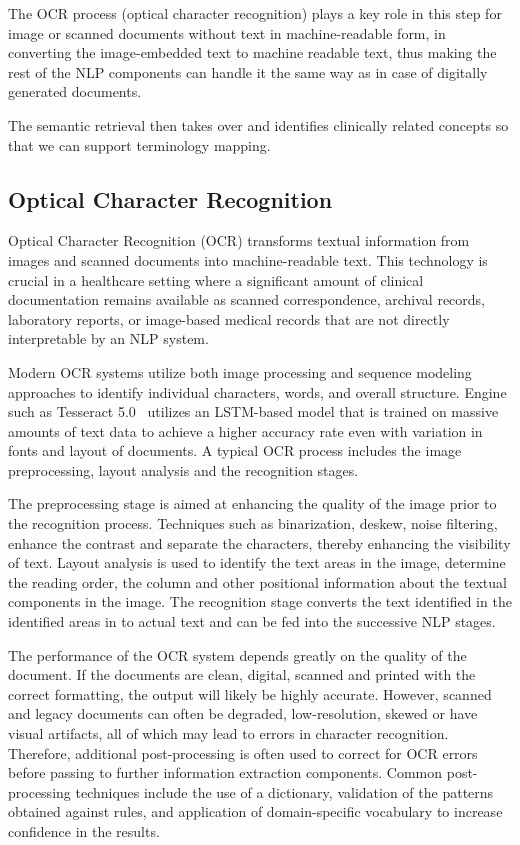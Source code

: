 The OCR process (optical character recognition) plays a key role in this step for image or scanned documents without text in machine-readable form, in converting the image-embedded text to machine readable text, thus making the rest of the NLP components can handle it the same way as in case of digitally generated documents.

The semantic retrieval then takes over and identifies clinically related concepts so that we can support terminology mapping.

\subsection{Optical Character Recognition}

Optical Character Recognition (OCR) transforms textual information from images and scanned documents into machine-readable text. This technology is crucial in a healthcare setting where a significant amount of clinical documentation remains available as scanned correspondence, archival records, laboratory reports, or image-based medical records that are not directly interpretable by an NLP system.

Modern OCR systems utilize both image processing and sequence modeling approaches to identify individual characters, words, and overall structure. Engine such as Tesseract 5.0~\cite{ref36} utilizes an LSTM-based model that is trained on massive amounts of text data to achieve a higher accuracy rate even with variation in fonts and layout of documents. A typical OCR process includes the image preprocessing, layout analysis and the recognition stages.

The preprocessing stage is aimed at enhancing the quality of the image prior to the recognition process. Techniques such as binarization, deskew, noise filtering, enhance the contrast and separate the characters, thereby enhancing the visibility of text. Layout analysis is used to identify the text areas in the image, determine the reading order, the column and other positional information about the textual components in the image. The recognition stage converts the text identified in the identified areas in to actual text and can be fed into the successive NLP stages.

The performance of the OCR system depends greatly on the quality of the document. If the documents are clean, digital, scanned and printed with the correct formatting, the output will likely be highly accurate. However, scanned and legacy documents can often be degraded, low-resolution, skewed or have visual artifacts, all of which may lead to errors in character recognition. Therefore, additional post-processing is often used to correct for OCR errors before passing to further information extraction components. Common post-processing techniques include the use of a dictionary, validation of the patterns obtained against rules, and application of domain-specific vocabulary to increase confidence in the results.

